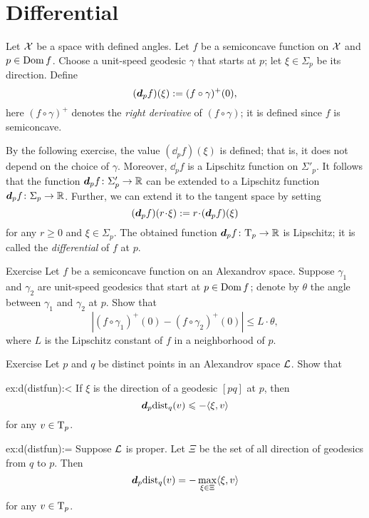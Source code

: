 \section{Differential}\label{sec:differential}


Let $\mathcal{X}$ be a space with defined angles.
Let $f$ be a semiconcave function on $\mathcal{X}$ and $p\in \mathop{\rm Dom}\nolimits f$.
Choose a unit-speed geodesic $\gamma$ that starts at $p$;
let $\xi\in\Sigma_p$ be its direction.
Define 
\[(\bm{d}_pf)(\xi)\mathrel{:=}(f\circ\gamma)^+(0),\]
here $(f\circ\gamma)^+$ denotes the \emph{right derivative} of $(f\circ\gamma)$;
it is defined since $f$ is semiconcave.

By the following exercise, the value $(\dd_pf)(\xi)$ is defined; that is, it does not depend on the choice of $\gamma$.
Moreover, $\dd_pf$ is a Lipschitz function on $\Sigma'_p$.
It follows that the function $\bm{d}_pf\colon\Sigma_p'\to\mathbb{R}$ can be extended to a Lipschitz function $\bm{d}_pf\colon\Sigma_p\to\mathbb{R}$.
Further, we can extend it to the tangent space by setting 
\[(\dd_pf)(r\cdot \xi)
\df
r\cdot (\dd_pf)(\xi)\]
for any $r\ge 0$ and $\xi\in\Sigma_p$.
The obtained function $\bm{d}_pf\colon\mathrm{T}_p\to\mathbb{R}$ is Lipschitz;
it is called the \emph{differential} of $f$ at $p$.

\begin{thm}{Exercise}\label{ex:df(xi)}
Let $f$ be a semiconcave function on an Alexandrov space.
Suppose $\gamma_1$ and $\gamma_2$ are unit-speed geodesics that start at $p\z\in \Dom f$;
denote by $\theta$ the angle between $\gamma_1$ and $\gamma_2$ at $p$.
Show that 
\[|(f\circ\gamma_1)^+(0)-(f\circ\gamma_2)^+(0)|\le L\cdot \theta,\]
where $L$ is the Lipschitz constant of $f$ in a neighborhood of $p$.
\end{thm}

\begin{thm}{Exercise}\label{ex:d(distfun)}
Let $p$ and $q$ be distinct points in an Alexandrov space $\mathcal{L}$.
Show that

\begin{subthm}{ex:d(distfun):<}
If $\xi$ is the direction of a geodesic $[pq]$ at $p$, then
\[\bm{d}_p\mathrm{dist}_q(v)\leqslant -\langle\xi,v\rangle\]
for any $v\in\mathrm{T}_p$.
\end{subthm}

\begin{subthm}{ex:d(distfun):=}
Suppose $\mathcal{L}$ is proper.
Let $\Xi$ be the set of all direction of  geodesics from $q$ to $p$.
Then
\[\bm{d}_p\mathrm{dist}_q(v)=-\max_{\xi\in\Xi}\langle\xi,v\rangle\]
for any $v\in\mathrm{T}_p$.
\end{subthm}
\end{thm}


